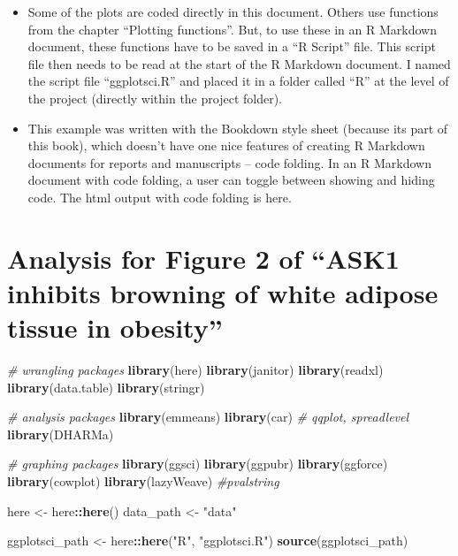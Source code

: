 \documentclass[]{book}
\newenvironment{Shaded}{\begin{snugshade}}{\end{snugshade}}
\newcommand{\CommentTok}[1]{\textcolor[rgb]{0.56,0.35,0.01}{\textit{#1}}}
\newcommand{\KeywordTok}[1]{\textcolor[rgb]{0.13,0.29,0.53}{\textbf{#1}}}
\newcommand{\NormalTok}[1]{#1}
\newcommand{\OperatorTok}[1]{\textcolor[rgb]{0.81,0.36,0.00}{\textbf{#1}}}
\newcommand{\StringTok}[1]{\textcolor[rgb]{0.31,0.60,0.02}{#1}}
\begin{document}
\begin{itemize}
\item
  Some of the plots are coded directly in this document. Others use functions from the chapter ``Plotting functions''. But, to use these in an R Markdown document, these functions have to be saved in a ``R Script'' file. This script file then needs to be read at the start of the R Markdown document. I named the script file ``ggplotsci.R'' and placed it in a folder called ``R'' at the level of the project (directly within the project folder).
\item
  This example was written with the Bookdown style sheet (because its part of this book), which doesn't have one nice features of creating R Markdown documents for reports and manuscripts -- code folding. In an R Markdown document with code folding, a user can toggle between showing and hiding code. The html output with code folding is here.
\end{itemize}

\hypertarget{analysis-for-figure-2-of-ask1-inhibits-browning-of-white-adipose-tissue-in-obesity}{%
\chapter{Analysis for Figure 2 of ``ASK1 inhibits browning of white adipose tissue in obesity''}\label{analysis-for-figure-2-of-ask1-inhibits-browning-of-white-adipose-tissue-in-obesity}}

\begin{Shaded}
\begin{Highlighting}[]
\CommentTok{# wrangling packages}
\KeywordTok{library}\NormalTok{(here)}
\KeywordTok{library}\NormalTok{(janitor)}
\KeywordTok{library}\NormalTok{(readxl)}
\KeywordTok{library}\NormalTok{(data.table)}
\KeywordTok{library}\NormalTok{(stringr)}

\CommentTok{# analysis packages}
\KeywordTok{library}\NormalTok{(emmeans)}
\KeywordTok{library}\NormalTok{(car) }\CommentTok{# qqplot, spreadlevel}
\KeywordTok{library}\NormalTok{(DHARMa)}

\CommentTok{# graphing packages}
\KeywordTok{library}\NormalTok{(ggsci)}
\KeywordTok{library}\NormalTok{(ggpubr)}
\KeywordTok{library}\NormalTok{(ggforce)}
\KeywordTok{library}\NormalTok{(cowplot)}
\KeywordTok{library}\NormalTok{(lazyWeave) }\CommentTok{#pvalstring}

\NormalTok{here <-}\StringTok{ }\NormalTok{here}\OperatorTok{::}\KeywordTok{here}\NormalTok{()}
\NormalTok{data_path <-}\StringTok{ "data"}

\NormalTok{ggplotsci_path <-}\StringTok{ }\NormalTok{here}\OperatorTok{::}\KeywordTok{here}\NormalTok{(}\StringTok{"R"}\NormalTok{, }\StringTok{"ggplotsci.R"}\NormalTok{)}
\KeywordTok{source}\NormalTok{(ggplotsci_path)}
\end{Highlighting}
\end{Shaded}
\end{document}
